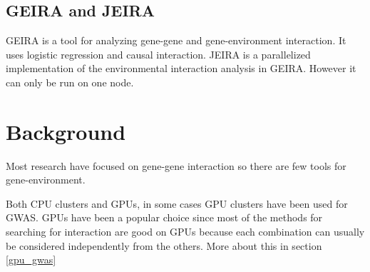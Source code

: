 \documentclass[10pt,a4paper]{report}
\begin{document}
\section{GEIRA and JEIRA}
GEIRA is a tool for analyzing gene-gene and gene-environment interaction. It uses logistic regression and causal interaction\cite{geira}. JEIRA is a parallelized implementation of the environmental interaction analysis in GEIRA. However it can only be run on one node.

\clearpage
\chapter{Background}

Most research have focused on gene-gene interaction so there are few tools for gene-environment.

Both CPU clusters\cite{biforce} and GPUs\cite{gwis,gboost,gmdr_gpu,cuda_lr,genie_2012,plink_gpu}, in some cases GPU clusters\cite{gwis_conf} have been used for GWAS. GPUs have been a popular choice since most of the methods for searching for interaction are good on GPUs because each combination can usually be considered independently from the others. More about this in section \ref{gpu_gwas}
\end{document}
